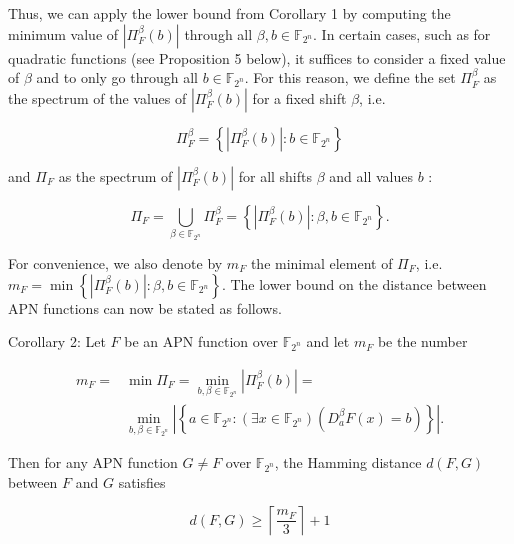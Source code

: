 \documentclass[10pt]{article}
\begin{document}
Thus, we can apply the lower bound from Corollary 1 by computing the minimum value of $\left|\Pi_{F}^{\beta}(b)\right|$ through all $\beta, b \in \mathbb{F}_{2^{n}}$. In certain cases, such as for quadratic functions (see Proposition 5 below), it suffices to consider a fixed value of $\beta$ and to only go through all $b \in \mathbb{F}_{2^{n}}$. For this reason, we define the set $\Pi_{F}^{\beta}$ as the spectrum of the values of $\left|\Pi_{F}^{\beta}(b)\right|$ for a fixed shift $\beta$, i.e.

$$
\Pi_{F}^{\beta}=\left\{\left|\Pi_{F}^{\beta}(b)\right|: b \in \mathbb{F}_{2^{n}}\right\}
$$

and $\Pi_{F}$ as the spectrum of $\left|\Pi_{F}^{\beta}(b)\right|$ for all shifts $\beta$ and all values $b$ :

$$
\Pi_{F}=\bigcup_{\beta \in \mathbb{F}_{2^{n}}} \Pi_{F}^{\beta}=\left\{\left|\Pi_{F}^{\beta}(b)\right|: \beta, b \in \mathbb{F}_{2^{n}}\right\} .
$$

For convenience, we also denote by $m_{F}$ the minimal element of $\Pi_{F}$, i.e. $m_{F}=\min \left\{\left|\Pi_{F}^{\beta}(b)\right|: \beta, b \in \mathbb{F}_{2^{n}}\right\}$. The lower bound on the distance between APN functions can now be stated as follows.

Corollary 2: Let $F$ be an APN function over $\mathbb{F}_{2^{n}}$ and let $m_{F}$ be the number

$$
\begin{aligned}
m_{F}= & \min \Pi_{F}=\min _{b, \beta \in \mathbb{F}_{2^{n}}}\left|\Pi_{F}^{\beta}(b)\right|= \\
& \min _{b, \beta \in \mathbb{F}_{2^{n}}}\left|\left\{a \in \mathbb{F}_{2^{n}}:\left(\exists x \in \mathbb{F}_{2^{n}}\right)\left(D_{a}^{\beta} F(x)=b\right)\right\}\right| .
\end{aligned}
$$

Then for any APN function $G \neq F$ over $\mathbb{F}_{2^{n}}$, the Hamming distance $d(F, G)$ between $F$ and $G$ satisfies


\begin{equation*}
d(F, G) \geq\left\lceil\frac{m_{F}}{3}\right\rceil+1 \tag{5}
\end{equation*}
\end{document}
